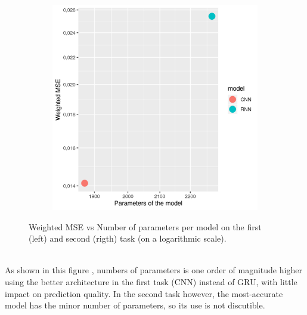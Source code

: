 \begin{figure}[!h]
  \begin{subfigure}[b]{0.4\linewidth} \includegraphics[width=\linewidth]{imgs/performance_parameters_Weighted_MSE2.png}
  \end{subfigure}
    \caption{Weighted MSE vs Number of parameters per model on the first (left) and second (rigth) task (on a logarithmic scale).}
    \label{fig:banana}
\end{figure}\\
  
As shown in this figure%
, numbers of parameters is one order of magnitude higher using the better architecture in the first task (CNN) instead of GRU, with little impact on prediction quality.
In the second task however, the most-accurate model has the minor number of parameters, so its use is not discutible.

